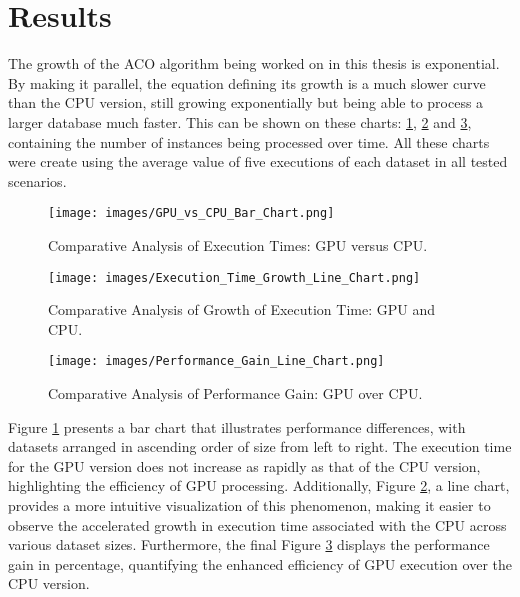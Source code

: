 \section{Results} \label{Results}

The growth of the ACO algorithm being worked on in this thesis is exponential.
By making it parallel, the equation defining its growth is a much slower curve than the CPU version,
still growing exponentially but being able to process a larger database much faster.
This can be shown on these charts: \ref{fig:gpu_vs_cpu}, \ref{fig:execution_time_growth} and
\ref{fig:performance_gain}, containing the number of instances being processed over time. All these charts
were create using the average value of five executions of each dataset in all tested scenarios.

\begin{figure}[h!]
    \centering
    \texttt{[image: images/GPU\_vs\_CPU\_Bar\_Chart.png]}
    \caption{Comparative Analysis of Execution Times: GPU versus CPU.}
    \label{fig:gpu_vs_cpu}
\end{figure}

\begin{figure}[h!]
    \centering
    \texttt{[image: images/Execution\_Time\_Growth\_Line\_Chart.png]}
    \caption{Comparative Analysis of Growth of Execution Time: GPU and CPU.}
    \label{fig:execution_time_growth}
\end{figure}

\begin{figure}[h!]
    \centering
    \texttt{[image: images/Performance\_Gain\_Line\_Chart.png]}
    \caption{Comparative Analysis of Performance Gain: GPU over CPU.}
    \label{fig:performance_gain}
\end{figure}

Figure \ref{fig:gpu_vs_cpu} presents a bar chart that illustrates performance differences, with datasets arranged in ascending order of size from left to right. The execution time for the GPU version does not increase as rapidly as that of the CPU version, highlighting the efficiency of GPU processing. Additionally, Figure \ref{fig:execution_time_growth}, a line chart, provides a more intuitive visualization of this phenomenon, making it easier to observe the accelerated growth in execution time associated with the CPU across various dataset sizes. Furthermore, the final Figure \ref{fig:performance_gain} displays the performance gain in percentage, quantifying the enhanced efficiency of GPU execution over the CPU version.


